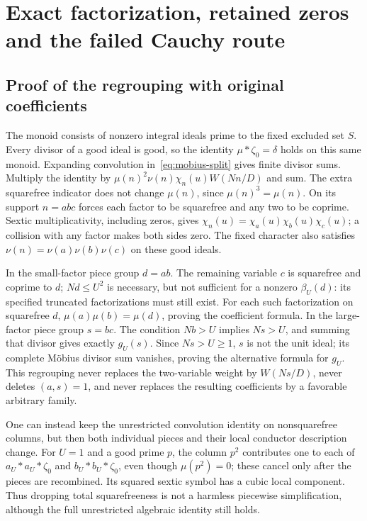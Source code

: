 \section{Exact factorization, retained zeros and the failed Cauchy route}
\label{sec:mobius-split-details}
\subsection{Proof of the regrouping with original coefficients}
The monoid consists of nonzero integral ideals prime to the fixed excluded
set $S$. Every divisor of a good ideal is good, so the identity
$\mu*\zeta_0=\delta$ holds on this same monoid. Expanding convolution
in~\eqref{eq:mobius-split} gives finite divisor sums. Multiply the identity
by $\mu(n)^2\nu(n)\chi_n(u)W(Nn/D)$ and sum. The extra squarefree
indicator does not change $\mu(n)$, since $\mu(n)^3=\mu(n)$.
On its support $n=abc$ forces each factor to be squarefree and any two
to be coprime. Sextic multiplicativity, including zeros, gives
$\chi_n(u)=\chi_a(u)\chi_b(u)\chi_c(u)$; a collision with any factor
makes both sides zero. The fixed character also satisfies
$\nu(n)=\nu(a)\nu(b)\nu(c)$ on these good ideals.

In the small-factor piece group $d=ab$. The remaining variable $c$ is
squarefree and coprime to $d$; $Nd\le U^2$ is necessary, but not sufficient
for a nonzero $\beta_U(d)$: its specified truncated factorizations must
still exist. For each such factorization on squarefree $d$,
$\mu(a)\mu(b)=\mu(d)$, proving the coefficient formula.
In the large-factor piece group $s=bc$. The condition $Nb>U$ implies
$Ns>U$, and summing that divisor gives exactly $g_U(s)$.
Since $Ns>U\ge1$, $s$ is not the unit ideal; its complete M\"obius
divisor sum vanishes, proving the alternative formula for $g_U$.
This regrouping never replaces the two-variable weight by $W(Ns/D)$,
never deletes $(a,s)=1$, and never replaces the resulting coefficients
by a favorable arbitrary family.

One can instead keep the unrestricted convolution identity on nonsquarefree
columns, but then both individual pieces and their local conductor
description change. For $U=1$ and a good prime $p$, the column $p^2$
contributes one to each of $a_U*a_U*\zeta_0$ and
$b_U*b_U*\zeta_0$, even though $\mu(p^2)=0$; these cancel only after
the pieces are recombined. Its squared sextic symbol has a cubic local
component. Thus dropping total squarefreeness is not a harmless
piecewise simplification, although the full unrestricted algebraic
identity still holds.

